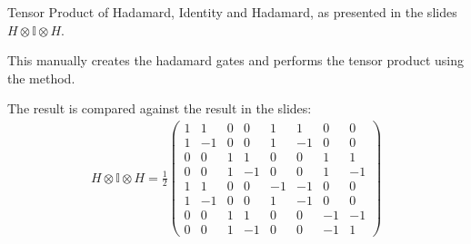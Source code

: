 \documentclass[letterpaper,10pt,english]{sphinxmanual}
\begin{document}
\begin{fulllineitems}
\label{\detokenize{index:tests.test_tensor.TestOperator}}
\pysigstartsignatures
{}
\pysigstopsignatures{}

\begin{fulllineitems}
\label{\detokenize{index:tests.test_tensor.TestOperator.test_operator_tensor_product_vs_notes}}
\pysigstartsignatures
{}
\pysigstopsignatures
\sphinxAtStartPar
Tensor Product of Hadamard, Identity and Hadamard, as presented in 
the slides \sphinxhyphen{} \(H \otimes \mathbb{I} \otimes H\).

\sphinxAtStartPar
This manually creates the hadamard gates and performs the tensor product 
using the  method.

\sphinxAtStartPar
The result is compared against the result in the slides:
\begin{equation*}
\begin{split}H \otimes \mathbb{I} \otimes H = \frac{1}{2}
    \begin{pmatrix}
        1 & 1 & 0 & 0 & 1 & 1 & 0 & 0 \\
        1 & -1 & 0 & 0 & 1 & -1 & 0 & 0 \\
        0 & 0 & 1 & 1 & 0 & 0 & 1 & 1 \\
        0 & 0 & 1 & -1 & 0 & 0 & 1 & -1 \\
        1 & 1 & 0 & 0 & -1 & -1 & 0 & 0 \\
        1 & -1 & 0 & 0 & 1 & -1 & 0 & 0 \\
        0 & 0 & 1 & 1 & 0 & 0 & -1 & -1 \\
        0 & 0 & 1 & -1 & 0 & 0 & -1 & 1
    \end{pmatrix}\end{split}
\end{equation*}
\end{fulllineitems}


\end{fulllineitems}
\end{document}
